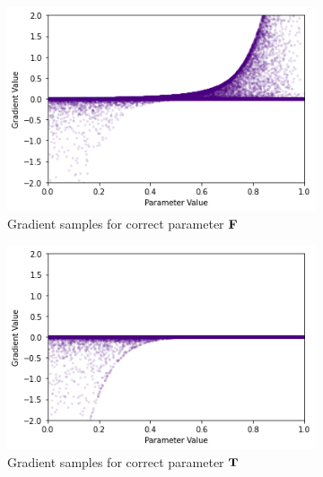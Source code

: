 \begin{figure}[ht]
    \centering
    \begin{subfigure}[b]{0.47\textwidth}
        \centering
        \includegraphics[width=\textwidth]{imgs/grad_ss_10_falseparam.png}
        \caption{Gradient samples for correct parameter $\textbf{F}$}
        \label{fig:conjgrad10falsess}
    \end{subfigure}
    \begin{subfigure}[b]{0.47\textwidth}
        \centering
        \includegraphics[width=\textwidth]{imgs/grad_ss_10_trueparam.png}
        \caption{Gradient samples for correct parameter $\textbf{T}$}
        \label{fig:conjgrad10truess}
    \end{subfigure}
    \begin{subfigure}[b]{0.47\textwidth}
        \centering

\end{subfigure}
\end{figure}
